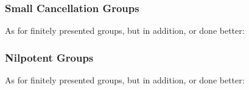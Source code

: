 \subsubsection{Small Cancellation Groups}

As for finitely presented groups, but in addition, or done better:


\begin{enumerate}




\end{enumerate}



\begin{enumerate}


\end{enumerate}



\subsubsection{Nilpotent Groups}

As for finitely presented groups, but in addition, or done better:


\begin{enumerate}




\end{enumerate}


\begin{enumerate}



\end{enumerate}



